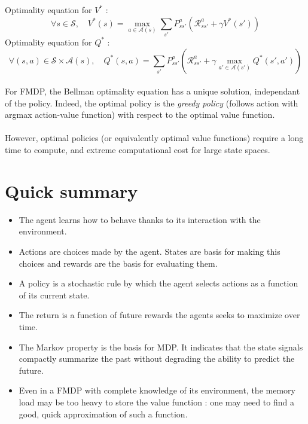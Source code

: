 \documentclass[a4paper]{article}
\begin{document}
{{{				
				{
					Optimality equation for $V^*$ :
					\begin{equation}
						\forall{s}\in\mathcal{S}, \quad V^*(s) = \max_{a\in\mathcal{A}(s)} \sum_{s'}P_{ss'}^a \left( \mathcal{R}_{ss'}^a + \gamma V^*(s')\right)
					\end{equation}
					Optimality equation for $Q^*$ :
					\begin{equation}
						\forall{(s,a)}\in\mathcal{S}\times\mathcal{A}(s), \quad Q^*(s,a) = \sum_{s'}P_{ss'}^a \left( \mathcal{R}_{ss'}^a + \gamma \max_{a'\in\mathcal{A}(s')}Q^*(s',a')\right)
					\end{equation}
				}
				
				\paragraph{} For FMDP, the Bellman optimality equation has a unique solution, independant of the policy. Indeed, the optimal policy is the \emph{greedy policy} (follows action with argmax action-value function) with respect to the optimal value function. 
				
				\paragraph{} However, optimal policies (or equivalently optimal value functions) require a long time to compute, and extreme computational cost for large state spaces. 
			}
			
		}
		
		\section{Quick summary}
		{
			\begin{itemize}
				\item The agent learns how to behave thanks to its interaction with the environment. 
				\item Actions are choices made by the agent. States are basis for making this choices and rewards are the basis for evaluating them. 
				\item A policy is a stochastic rule by which the agent selects actions as a function of its current state. 
				\item The return is a function of future rewards the agents seeks to maximize over time. 
				\item The Markov property is the basis for MDP. It indicates that the state signals compactly summarize the past without degrading the ability to predict the future. 
				\item Even in a FMDP with complete knowledge of its environment, the memory load may be too heavy to store the value function : one may need to find a good, quick approximation of such a function. 
			\end{itemize}
		}
	}
	
\end{document}
